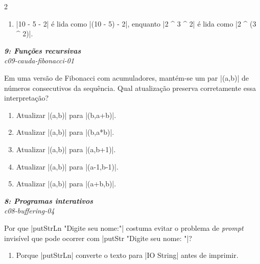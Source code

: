 \documentclass[a4paper,10pt,brazil]{article}
\begin{document}
\begin{multicols}{2}
\begin{enumerate}
  \item \haskellinline|10 - 5 - 2| é lida como \haskellinline|(10 - 5) - 2|, enquanto \haskellinline|2 ^ 3 ^ 2| é lida como \haskellinline|2 ^ (3 ^ 2)|.


\end{enumerate}

\begin{flushright}
  \footnotesize
  \textit{\textbf{9: Funções recursivas}}\\
  \textit{c09-cauda-fibonacci-01}\\

\end{flushright}
Em uma versão de Fibonacci com acumuladores, mantém-se um par \haskellinline|(a,b)| de números consecutivos da sequência. Qual atualização preserva corretamente essa interpretação?

\begin{enumerate}
  \item Atualizar \haskellinline|(a,b)| para \haskellinline|(b,a+b)|.

  \item Atualizar \haskellinline|(a,b)| para \haskellinline|(b,a*b)|.

  \item Atualizar \haskellinline|(a,b)| para \haskellinline|(a,b+1)|.

  \item Atualizar \haskellinline|(a,b)| para \haskellinline|(a-1,b-1)|.

  \item Atualizar \haskellinline|(a,b)| para \haskellinline|(a+b,b)|.


\end{enumerate}

\begin{flushright}
  \footnotesize
  \textit{\textbf{8: Programas interativos}}\\
  \textit{c08-buffering-04}\\

\end{flushright}
Por que \haskellinline|putStrLn "Digite seu nome:"| costuma evitar o problema de \emph{prompt} invisível que pode ocorrer com \haskellinline|putStr "Digite seu nome: "|?

\begin{enumerate}
  \item Porque \haskellinline|putStrLn| converte o texto para \haskellinline|IO String| antes de imprimir.


\end{enumerate}
\end{multicols}
\end{document}

